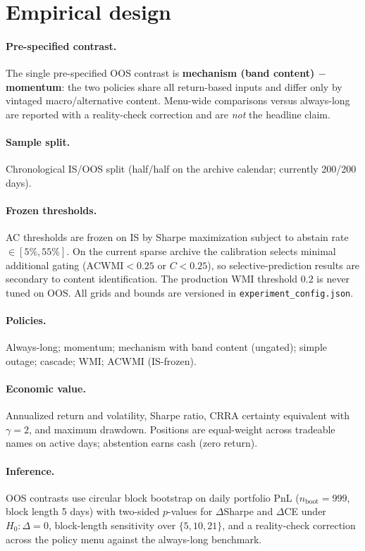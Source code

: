 \documentclass[12pt]{article}
\begin{document}
\section{Empirical design}
\label{sec:design}

\paragraph{Pre-specified contrast.}
The single pre-specified OOS contrast is \textbf{mechanism (band content) $-$ momentum}: the two policies share all return-based inputs and differ only by vintaged macro/alternative content. Menu-wide comparisons versus always-long are reported with a reality-check correction and are \emph{not} the headline claim.

\paragraph{Sample split.}
Chronological IS/OOS split (half/half on the archive calendar; currently 200/200 days).

\paragraph{Frozen thresholds.}
AC thresholds are frozen on IS by Sharpe maximization subject to abstain rate $\in[5\%,55\%]$. On the current sparse archive the calibration selects minimal additional gating ($\mathrm{ACWMI}<0.25$ or $C<0.25$), so selective-prediction results are secondary to content identification. The production WMI threshold $0.2$ is never tuned on OOS. All grids and bounds are versioned in \texttt{experiment\_config.json}.

\paragraph{Policies.}
Always-long; momentum; mechanism with band content (ungated); simple outage; cascade; WMI; ACWMI (IS-frozen).

\paragraph{Economic value.}
Annualized return and volatility, Sharpe ratio, CRRA certainty equivalent with $\gamma=2$, and maximum drawdown. Positions are equal-weight across tradeable names on active days; abstention earns cash (zero return).

\paragraph{Inference.}
OOS contrasts use circular block bootstrap on daily portfolio PnL ($n_{\mathrm{boot}}=999$, block length 5 days) with two-sided $p$-values for $\Delta$Sharpe and $\Delta$CE under $H_0:\Delta=0$, block-length sensitivity over $\{5,10,21\}$, and a \citet{white2000} reality-check correction across the policy menu against the always-long benchmark.
\end{document}
